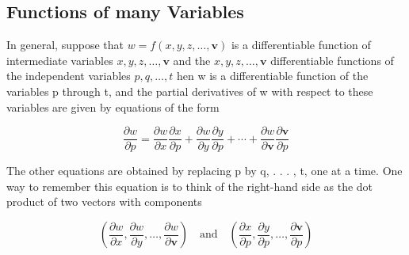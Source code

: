 \documentclass[12pt,a4paper,draft]{article}
\begin{document}
\subsection{Functions of many Variables}

In general, suppose that \(w = f(x,y,z, \dots, \mathbf{v})\) is a differentiable function of intermediate variables \(x,y,z, \dots, \mathbf{v}\) and the \(x,y,z, \dots, \mathbf{v}\) differentiable functions of the independent variables \(p,q, \dots, t\) hen w is a differentiable
function of the variables p through t, and the partial derivatives of w with respect to these variables are given by equations of the form

\[\frac{\partial w}{\partial p}=\frac{\partial w}{\partial x} \frac{\partial x}{\partial p}+\frac{\partial w}{\partial y} \frac{\partial y}{\partial p}+\cdots+\frac{\partial w}{\partial \boldsymbol{v}} \frac{\partial \boldsymbol{v}}{\partial p}\]


The other equations are obtained by replacing p by q, . . . , t, one at a time. One way to remember this equation is to think of the right-hand side as the dot product of two vectors with components

\[\left(\frac{\partial w}{\partial x}, \frac{\partial w}{\partial y}, \dots, \frac{\partial w}{\partial \mathbf{v}}\right) \quad \text{and} \quad \left(\frac{\partial x}{\partial p}, \frac{\partial y}{\partial p}, \dots, \frac{\partial \mathbf{v}}{\partial p}\right)\]
\end{document}
